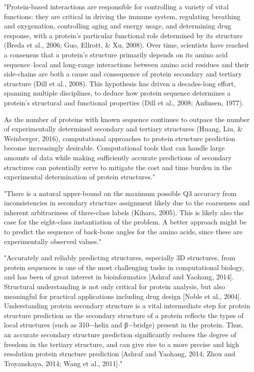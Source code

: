 \documentclass[]{scrartcl}
\begin{document}
"Protein-based interactions are responsible for controlling a variety of vital functions: they are critical in driving the immune system, regulating breathing and oxygenation, controlling aging and energy usage, and determining drug response, with a protein’s particular functional role determined by its structure (Breda et al., 2006; Guo, Ellrott, \& Xu, 2008). Over time, scientists have reached a consensus that a protein’s structure primarily depends on its amino acid sequence–local and long-range interactions between amino acid residues and their side-chains are both a cause and consequence of protein secondary and tertiary structure (Dill et al., 2008). This hypothesis has driven a decades-long effort, spanning multiple disciplines, to deduce how protein sequence determines a protein’s structural and functional properties (Dill et al., 2008; Anfinsen, 1977).

As the number of proteins with known sequence continues to outpace the number of experimentally determined secondary and tertiary structures (Huang, Liu, \& Weinberger, 2016), computational approaches to protein structure prediction become increasingly desirable. Computational tools that can handle large amounts of data while making sufficiently accurate predictions of secondary structures can potentially serve to mitigate the cost and time burden in the experimental determination of protein structures." \cite{Busia2017}

"There is a natural upper-bound on the maximum possible Q3 accuracy from inconsistencies in secondary structure assignment likely due to the coarseness and inherent arbitrariness of three-class labels (Kihara, 2005). This is likely also the case for the eight-class instantiation of the problem. A better approach might be to predict the sequence of back-bone angles for the amino acids, since these are experimentally observed values." \cite{Busia2017}

"Accurately and reliably predicting structures, especially 3D structures, from protein sequences is one of the most challenging tasks in computational biology, and has been of great interest in bioinformatics [Ashraf and Yaohang, 2014]. Structural understanding is not only critical for protein analysis, but also meaningful for practical applications including drug design [Noble et al., 2004]. Understanding protein secondary structure is a vital intermediate step for protein structure prediction as the secondary structure of a protein reflects the types of local structures (such as 310−helix and β−bridge) present in the protein. Thus, an accurate secondary structure prediction significantly reduces the degree of freedom in the tertiary structure, and can give rise to a more precise and high resolution protein structure prediction [Ashraf and Yaohang, 2014; Zhou and Troyanskaya, 2014; Wang et al., 2011]." \cite{Li2016}
\end{document}
